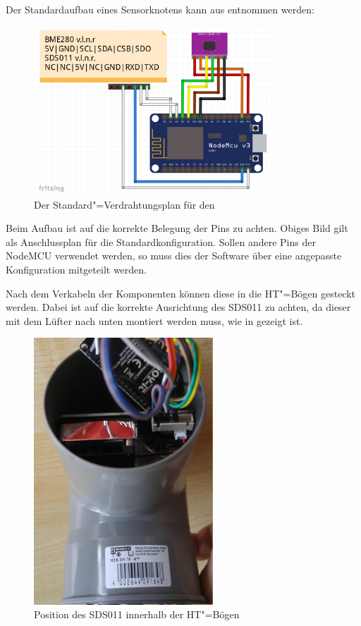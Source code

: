 Der Standardaufbau eines Sensorknotens kann aus  entnommen werden:

\begin{figure}[htb]
	\centering
	\includegraphics[width=0.8\textwidth]{./ressourcen/Prod_Verdrahtungsplan}
	\caption{Der Standard"=Verdrahtungsplan für den \sk}
	\label{fig:skwiringdefault}
\end{figure}

Beim Aufbau ist auf die korrekte Belegung der Pins zu achten. Obiges Bild gilt als Anschlussplan für die Standardkonfiguration.
Sollen andere Pins der NodeMCU verwendet werden, so muss dies der Software über eine angepasste Konfiguration mitgeteilt werden.

Nach dem Verkabeln der Komponenten können diese in die HT"=Bögen gesteckt werden.
Dabei ist auf die korrekte Ausrichtung des SDS011 zu achten, da dieser mit dem Lüfter nach unten montiert werden muss, wie in  gezeigt ist.

\begin{figure}[!htb]
	\centering
	\includegraphics[width=0.6\textwidth]{./ressourcen/SK_AusrichtungSDS.jpg}
	\caption{Position des SDS011 innerhalb der HT"=Bögen}
	\label{fig:skpositionsds011}
\end{figure}


